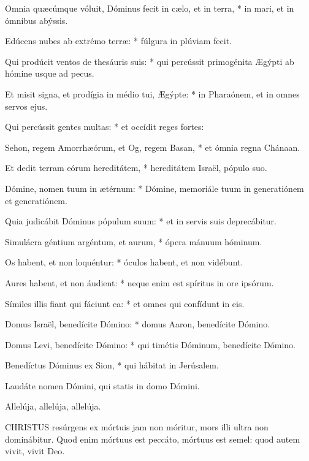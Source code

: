 Omnia quæcúmque vóluit, Dóminus fecit in cælo, et in terra, * in mari, et in ómnibus abýssis.

Edúcens nubes ab extrémo terræ: * fúlgura in plúviam fecit.

Qui prodúcit ventos de thesáuris suis: * qui percússit primogénita Ægýpti ab hómine usque ad pecus.

Et misit signa, et prodígia in médio tui, Ægýpte: * in Pharaónem, et in omnes servos ejus.

Qui percússit gentes multas: * et occídit reges fortes:

Sehon, regem Amorrhæórum, et Og, regem Basan, * et ómnia regna Chánaan.

Et dedit terram eórum hereditátem, * hereditátem Israël, pópulo suo.

Dómine, nomen tuum in ætérnum: * Dómine, memoriále tuum in generatiónem et generatiónem.

Quia judicábit Dóminus pópulum suum: * et in servis suis deprecábitur.

Simulácra géntium argéntum, et aurum, * ópera mánuum hóminum.

Os habent, et non loquéntur: * óculos habent, et non vidébunt.

Aures habent, et non áudient: * neque enim est spíritus in ore ipsórum.

Símiles illis fiant qui fáciunt ea: * et omnes qui confídunt in eis.

Domus Israël, benedícite Dómino: * domus Aaron, benedícite Dómino.

Domus Levi, benedícite Dómino: * qui timétis Dóminum, benedícite Dómino.

Benedíctus Dóminus ex Sion, * qui hábitat in Jerúsalem.


 Laudáte nomen Dómini, qui statis in domo Dómini.


 Allelúja, allelúja, allelúja.



\lettrine[lines=2]{C}{HRISTUS} resúrgens ex mórtuis jam non móritur, mors illi ultra non dominábitur. Quod enim mórtuus est peccáto, mórtuus est semel: quod autem vivit, vivit Deo.


